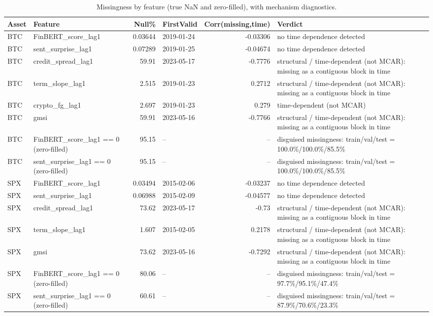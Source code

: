 \begin{table}[htbp]
\centering
\caption{Missingness by feature (true NaN and zero-filled), with mechanism diagnostics.}
\label{tab:t5_missingness}
\begin{tabular}{llrlrl}
\toprule
Asset & Feature & Null\% & FirstValid & Corr(missing,time) & Verdict \\
\midrule
BTC & FinBERT\_score\_lag1 & 0.03644 & 2019-01-24 & -0.03306 & no time dependence detected \\
BTC & sent\_surprise\_lag1 & 0.07289 & 2019-01-25 & -0.04674 & no time dependence detected \\
BTC & credit\_spread\_lag1 & 59.91 & 2023-05-17 & -0.7776 & structural / time-dependent (not MCAR): missing as a contiguous block in time \\
BTC & term\_slope\_lag1 & 2.515 & 2019-01-23 & 0.2712 & structural / time-dependent (not MCAR): missing as a contiguous block in time \\
BTC & crypto\_fg\_lag1 & 2.697 & 2019-01-23 & 0.279 & time-dependent (not MCAR) \\
BTC & gmsi & 59.91 & 2023-05-16 & -0.7766 & structural / time-dependent (not MCAR): missing as a contiguous block in time \\
BTC & FinBERT\_score\_lag1 == 0 (zero-filled) & 95.15 & -- & -- & disguised missingness: train/val/test = 100.0\%/100.0\%/85.5\% \\
BTC & sent\_surprise\_lag1 == 0 (zero-filled) & 95.15 & -- & -- & disguised missingness: train/val/test = 100.0\%/100.0\%/85.5\% \\
SPX & FinBERT\_score\_lag1 & 0.03494 & 2015-02-06 & -0.03237 & no time dependence detected \\
SPX & sent\_surprise\_lag1 & 0.06988 & 2015-02-09 & -0.04577 & no time dependence detected \\
SPX & credit\_spread\_lag1 & 73.62 & 2023-05-17 & -0.73 & structural / time-dependent (not MCAR): missing as a contiguous block in time \\
SPX & term\_slope\_lag1 & 1.607 & 2015-02-05 & 0.2178 & structural / time-dependent (not MCAR): missing as a contiguous block in time \\
SPX & gmsi & 73.62 & 2023-05-16 & -0.7292 & structural / time-dependent (not MCAR): missing as a contiguous block in time \\
SPX & FinBERT\_score\_lag1 == 0 (zero-filled) & 80.06 & -- & -- & disguised missingness: train/val/test = 97.7\%/95.1\%/47.4\% \\
SPX & sent\_surprise\_lag1 == 0 (zero-filled) & 60.61 & -- & -- & disguised missingness: train/val/test = 87.9\%/70.6\%/23.3\% \\

\end{tabular}
\end{table}

